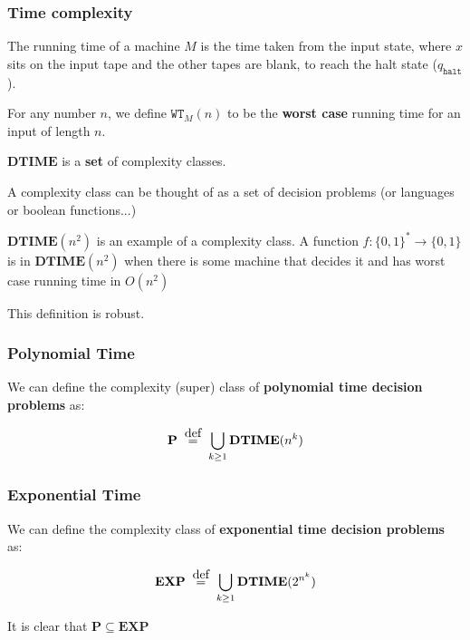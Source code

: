 \documentclass{beamer}
\newcommand{\DT}{\mathbf{DTIME}}
\newcommand\defeq{\stackrel{\mathclap{\normalfont\mbox{def}}}{=}}
\begin{document}
  \begin{frame}
    \frametitle{Time complexity}

    \begin{definition}

      The running time of a machine $M$ is the time taken from the input state, where $x$ sits on the input tape and the other tapes are blank, to reach the halt state ($q_{\texttt{halt} }$).

      For any number $n$, we define $\texttt{WT}_{M}(n) $ to be the \textbf{worst case} running time for an input of length $n$.
    \end{definition}

    \begin{definition}

      $\mathbf{DTIME} $ is a \textbf{set} of complexity classes.

      A complexity class can be thought of as a set of decision problems (or languages or boolean functions...)

      $\DT(n^{2})$ is an example of a complexity class. A function $f : \{ 0,1 \}^{*} \rightarrow \{ 0,1 \} $ is in $\DT(n^{2})$ when there is some machine that decides it and has worst case running time in $O(n^{2})$
    \end{definition}

    This definition is robust.


  \end{frame}

  \begin{frame}
    \frametitle{Polynomial Time}

    We can define the complexity (super) class of \textbf{polynomial time decision problems} as:

    \[
      \mathbf{P} \;\; \defeq \;\; \bigcup_{k\geq1}\mathbf{DTIME} (n^{k})
    \]

  \end{frame}

  \begin{frame}
    \frametitle{Exponential Time}

    We can define the complexity class of \textbf{exponential time decision problems} as:

    \[
      \mathbf{EXP} \;\; \defeq \;\; \bigcup_{k\geq 1} \mathbf{DTIME} (2^{n^{k}})
    \]

    It is clear that $\mathbf{P} \subseteq \mathbf{EXP} $


  \end{frame}
\end{document}
